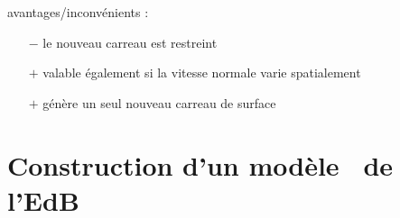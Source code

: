 avantages/inconvénients :
\begin{itemize}
	\item[$-$] le nouveau carreau est restreint
	\item[$+$] valable également si la vitesse normale varie spatialement
	\item[$+$] génère un seul nouveau carreau de surface
\end{itemize}








\section{Construction d'un modèle \brep\ de l'EdB}

